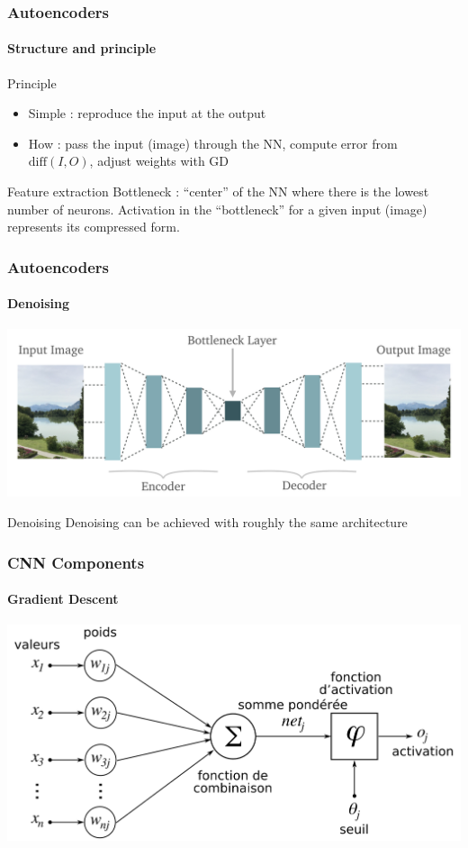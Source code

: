 \documentclass[]{beamer}
\begin{document}
\begin{frame}
  \frametitle{Autoencoders}
  \framesubtitle{Structure and principle}
  \begin{block}{Principle}
    \begin{itemize}
      \item \alert{Simple} : reproduce the input at the output
      \item \alert{How} : pass the input (image) through the NN, compute error from $\text{diff}(I, O)$, adjust weights with GD
    \end{itemize}
  \end{block}
  \begin{exampleblock}{Feature extraction}
    \alert{Bottleneck} : ``center'' of the NN where there is the lowest number of neurons. Activation in the ``bottleneck'' for a given input (image) represents its compressed form.
  \end{exampleblock}
\end{frame}

\begin{frame}
  \frametitle{Autoencoders}
  \framesubtitle{Denoising}
  \begin{center}
    \includegraphics[width=\linewidth]{resources/autoencoder}
  \end{center}

  \begin{exampleblock}{Denoising}
    Denoising can be achieved with roughly the same architecture
  \end{exampleblock}

\end{frame}

\begin{frame}
  \frametitle{CNN Components}
  \framesubtitle{Gradient Descent}
  \begin{center}
    \includegraphics[width=\linewidth]{resources/perceptron}
  \end{center}
\end{frame}
\end{document}
